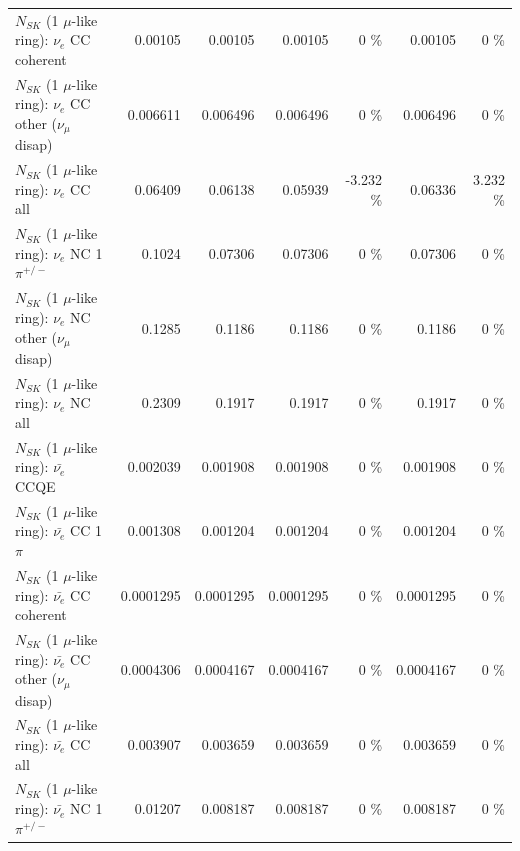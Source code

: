 \begin{table}
\begin{tabular}{| l | r | r | r  r | r  r |}
                               $N_{SK}$ (1 $\mu$-like ring): $\nu_e$ CC coherent &         0.00105 &         0.00105 &         0.00105 &        0 \%  &         0.00105 &        0 \%  \\ 
                $N_{SK}$ (1 $\mu$-like ring): $\nu_e$ CC other ($\nu_\mu$ disap) &        0.006611 &        0.006496 &        0.006496 &        0 \%  &        0.006496 &        0 \%  \\ 
                                  $N_{SK}$ (1 $\mu$-like ring): $\nu_{e}$ CC all &         0.06409 &         0.06138 &         0.05939 &   -3.232 \%  &         0.06336 &    3.232 \%  \\ 
\hline
                           $N_{SK}$ (1 $\mu$-like ring): $\nu_e$ NC 1$\pi^{+/-}$ &          0.1024 &         0.07306 &         0.07306 &        0 \%  &         0.07306 &        0 \%  \\ 
                $N_{SK}$ (1 $\mu$-like ring): $\nu_e$ NC other ($\nu_\mu$ disap) &          0.1285 &          0.1186 &          0.1186 &        0 \%  &          0.1186 &        0 \%  \\ 
                                  $N_{SK}$ (1 $\mu$-like ring): $\nu_{e}$ NC all &          0.2309 &          0.1917 &          0.1917 &        0 \%  &          0.1917 &        0 \%  \\ 
\hline
\hline
\hline
                                $N_{SK}$ (1 $\mu$-like ring): $\bar{\nu_e}$ CCQE &        0.002039 &        0.001908 &        0.001908 &        0 \%  &        0.001908 &        0 \%  \\ 
                           $N_{SK}$ (1 $\mu$-like ring): $\bar{\nu_e}$ CC 1$\pi$ &        0.001308 &        0.001204 &        0.001204 &        0 \%  &        0.001204 &        0 \%  \\ 
                         $N_{SK}$ (1 $\mu$-like ring): $\bar{\nu_e}$ CC coherent &       0.0001295 &       0.0001295 &       0.0001295 &        0 \%  &       0.0001295 &        0 \%  \\ 
          $N_{SK}$ (1 $\mu$-like ring): $\bar{\nu_e}$ CC other ($\nu_\mu$ disap) &       0.0004306 &       0.0004167 &       0.0004167 &        0 \%  &       0.0004167 &        0 \%  \\ 
                            $N_{SK}$ (1 $\mu$-like ring): $\bar{\nu_{e}}$ CC all &        0.003907 &        0.003659 &        0.003659 &        0 \%  &        0.003659 &        0 \%  \\ 
\hline
                     $N_{SK}$ (1 $\mu$-like ring): $\bar{\nu_e}$ NC 1$\pi^{+/-}$ &         0.01207 &        0.008187 &        0.008187 &        0 \%  &        0.008187 &        0 \%  \\ 

\end{tabular}
\end{table}
